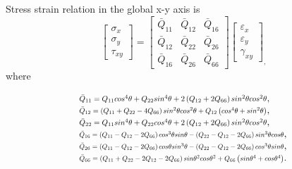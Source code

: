 Stress strain relation in the global x-y axis is
\begin{equation}\left[\begin{array}{l}\sigma _{x} \\ \sigma _{y} \\
	\tau_{xy}\end{array}\right]=\left[\begin{array}{lll}\bar{Q}_{11} &
\bar{Q}_{12} & \bar{Q}_{16}\\ \bar{Q}_{12} & \bar{Q}_{22} & \bar{Q}_{26} \\
\bar{Q}_{16} & \bar{Q}_{26}
			 &\bar{Q}_{66}\end{array}\right]\left[\begin{array}{l}\varepsilon_{x}
	 \\ \varepsilon_{y}\\ \gamma_{x y}\end{array}\right]_{\textstyle ,}
\end{equation}
where

\begin{equation}
	\begin{array}{l}
		\resizebox{.55\textwidth}{!}{$\bar{Q}_{11}=Q_{11} cos^{4}\theta+Q_{22} sin^{4}\theta+2\left(Q_{12}+2
		Q_{66}\right) sin^{2}\theta cos^{2}\theta$}, \\

		\resizebox{.55\textwidth}{!}{$\bar{Q}_{12}=\left(Q_{11}+Q_{22}-4 Q_{66}\right) sin^{2}\theta
		cos^{2}\theta+Q_{12}\left(cos^{4}\theta+sin^{2}\theta \right)$}, \\

		\resizebox{.55\textwidth}{!}{$\bar{Q}_{22}=Q_{11} sin^{4}\theta+Q_{22} cos^{4}\theta+2\left(Q_{12}+2
		Q_{66}\right) sin^{2}\theta cos^{2}\theta$}, \\

		\resizebox{.6\textwidth}{!}{$\bar{Q}_{16}=\left(Q_{11}-Q_{12}-2
		Q_{66}\right) cos^{3}\theta sin\theta-\left(Q_{22}-Q_{12}-2Q_{66}\right)
	sin^{3}\theta cos\theta$}, \\ 
		\resizebox{.6\textwidth}{!}{$\bar{Q}_{26}=\left(Q_{11}-Q_{12}-2
		Q_{66}\right) cos\theta sin^{3}\theta-\left(Q_{22}-Q_{12}-2
Q_{66}\right)cos^{3}\theta sin\theta$},
		 \\ 
	\resizebox{.6\textwidth}{!}	{$\bar{Q}_{66}=\left(Q_{11}+Q_{22}-2 Q_{12}-2 Q_{66}\right)
	sin\theta^{2}cos\theta^{2}+Q_{66}\left(sin\theta^{4}+cos\theta^{4}\right)$}.\\
	\end{array}
\end{equation}



